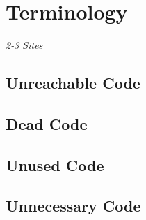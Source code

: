 
\chapter {Terminology}
\label {cha:terminology}
\emph{2-3 Sites}
\section{Unreachable Code}
\section{Dead Code}
\section{Unused Code}
\section{Unnecessary Code}